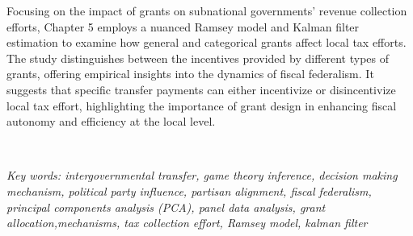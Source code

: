 Focusing on the impact of grants on subnational governments' revenue collection efforts, Chapter 5 employs a nuanced Ramsey model and Kalman filter estimation to examine how general and categorical grants affect local tax efforts. The study distinguishes between the incentives provided by different types of grants, offering empirical insights into the dynamics of fiscal federalism. It suggests that specific transfer payments can either incentivize or disincentivize local tax effort, highlighting the importance of grant design in enhancing fiscal autonomy and efficiency at the local level.

\ \hfill \

\noindent \textit{Key words: intergovernmental transfer, game theory inference, decision making mechanism, political party influence, partisan alignment, fiscal federalism, principal components analysis (PCA), panel data analysis, grant allocation,mechanisms, tax collection effort, Ramsey model, kalman filter}


\vspace{-0.3in}
